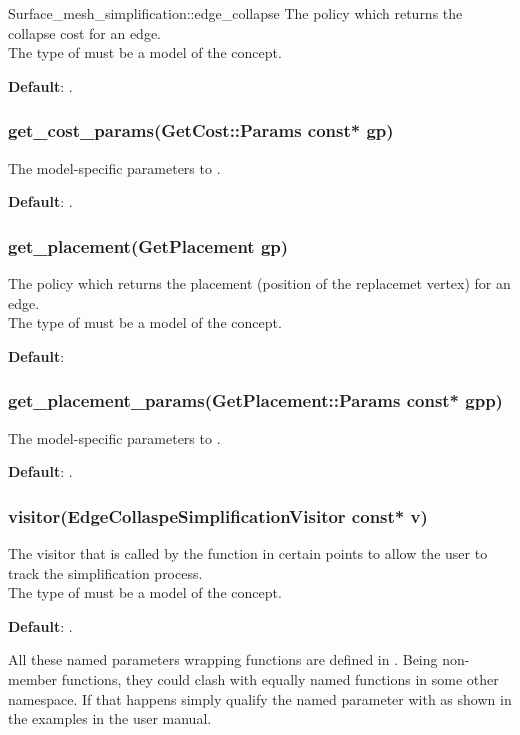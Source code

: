 \begin{ccRefFunction}{Surface_mesh_simplification::edge_collapse}
The policy which returns the collapse cost for an edge.\\
The type of  must be a model of the  concept.

\textbf{Default}: 
.


\subsubsection*{get\_cost\_params(GetCost::Params const* gp)}

The model-specific parameters to .

\textbf{Default}: .


\subsubsection*{get\_placement(GetPlacement gp)}

The policy which returns the placement (position of the replacemet vertex)
for an edge.\\
The type of  must be a model of the  concept.

\textbf{Default}: 



\subsubsection*{get\_placement\_params(GetPlacement::Params const* gpp)}

The model-specific parameters to .

\textbf{Default}: .



\subsubsection*{visitor(EdgeCollaspeSimplificationVisitor const* v)}

The visitor that is called by the  function
in certain points to allow the user to track the simplification process.\\
The type of  must be a model of the  concept.

\textbf{Default}: .

All these named parameters wrapping functions are defined in
. Being non-member functions, they could clash
with equally named functions in some other namespace. If that happens
simply qualify the named parameter with  as shown in the
examples in the user manual.


\end{ccRefFunction}
